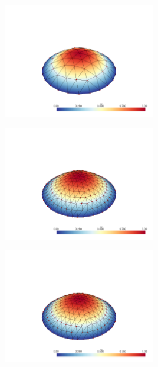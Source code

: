 \documentclass[
  11pt,
]{article}
\let\origfigure\figure
\let\endorigfigure\endfigure
\renewenvironment{figure}[1][2] {
    \expandafter\origfigure\expandafter[H]
} {
    \endorigfigure
}
\begin{document}
\begin{figure}
\centering
\includegraphics[width=0.5\textwidth,height=\textheight]{../img/mesh1-gauss19-b.png}
\caption{Finite element solution for problem 1 over mesh number 1 and
order-19 numerical integration.}
\end{figure}

\begin{figure}
\centering
\includegraphics[width=0.5\textwidth,height=\textheight]{../img/mesh2-gauss02-b.png}
\caption{Finite element solution for problem 1 over mesh number 2 and
order-2 numerical integration.}
\end{figure}

\begin{figure}
\centering
\includegraphics[width=0.5\textwidth,height=\textheight]{../img/mesh2-gauss05-b.png}
\caption{Finite element solution for problem 1 over mesh number 2 and
order-5 numerical integration.}
\end{figure}
\end{document}
